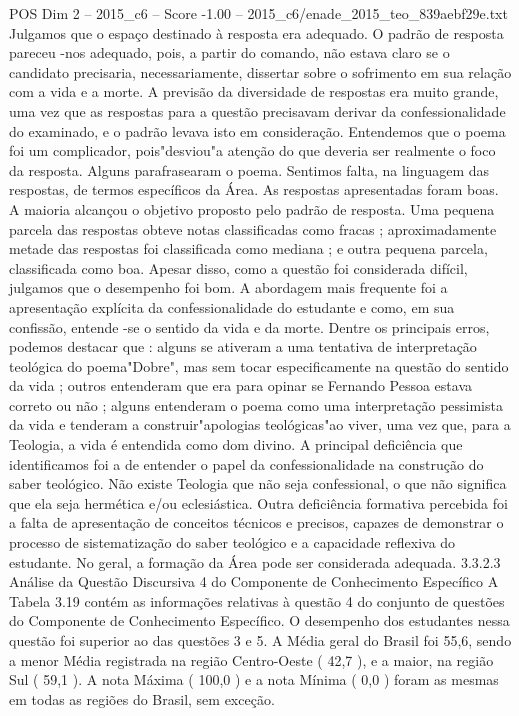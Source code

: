 \begin{textsample}{POS Dim 2 – 2015\_c6 – Score -1.00 – 2015\_c6/enade\_2015\_teo\_839aebf29e.txt}
Julgamos que o espaço destinado à resposta era adequado.
O padrão de resposta pareceu -nos adequado, pois, a partir do comando, não estava claro se o candidato precisaria, necessariamente, dissertar sobre o sofrimento em sua relação com a vida e a morte.
A previsão da diversidade de respostas era muito grande, uma vez que as respostas para a questão precisavam derivar da confessionalidade do examinado, e o padrão levava isto em consideração.
Entendemos que o poema foi um complicador, pois"desviou"a atenção do que deveria ser realmente o foco da resposta.
Alguns parafrasearam o poema.
Sentimos falta, na linguagem das respostas, de termos específicos da Área.
As respostas apresentadas foram boas.
A maioria alcançou o objetivo proposto pelo padrão de resposta.
Uma pequena parcela das respostas obteve notas classificadas como fracas ; aproximadamente metade das respostas foi classificada como mediana ; e outra pequena parcela, classificada como boa.
Apesar disso, como a questão foi considerada difícil, julgamos que o desempenho foi bom.
A abordagem mais frequente foi a apresentação explícita da confessionalidade do estudante e como, em sua confissão, entende -se o sentido da vida e da morte.
Dentre os principais erros, podemos destacar que : alguns se ativeram a uma tentativa de interpretação teológica do poema"Dobre", mas sem tocar especificamente na questão do sentido da vida ; outros entenderam que era para opinar se Fernando Pessoa estava correto ou não ; alguns entenderam o poema como uma interpretação pessimista da vida e tenderam a construir"apologias teológicas"ao viver, uma vez que, para a Teologia, a vida é entendida como dom divino.
A principal deficiência que identificamos foi a de entender o papel da confessionalidade na construção do saber teológico.
Não existe Teologia que não seja confessional, o que não significa que ela seja hermética e/ou eclesiástica.
Outra deficiência formativa percebida foi a falta de apresentação de conceitos técnicos e precisos, capazes de demonstrar o processo de sistematização do saber teológico e a capacidade reflexiva do estudante.
No geral, a formação da Área pode ser considerada adequada. 3.3.2.3 Análise da Questão Discursiva 4 do Componente de Conhecimento Específico A Tabela 3.19 contém as informações relativas à questão 4 do conjunto de questões do Componente de Conhecimento Específico.
O desempenho dos estudantes nessa questão foi superior ao das questões 3 e 5.
A Média geral do Brasil foi 55,6, sendo a menor Média registrada na região Centro-Oeste ( 42,7 ), e a maior, na região Sul ( 59,1 ).
A nota Máxima ( 100,0 ) e a nota Mínima ( 0,0 ) foram as mesmas em todas as regiões do Brasil, sem exceção.

\end{textsample}
